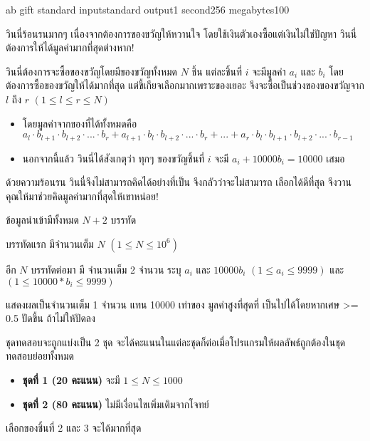 \documentclass[11pt,a4paper]{article}
\begin{document}
\begin{problem}{ab gift }{standard input}{standard output}{1 second}{256 megabytes}{100}

วินนี่ร้อนรนมากๆ เนื่องจากต้องการของขวัญให้หวานใจ โดยใช้เงินตัวเองซื้อแต่เงินไม่ใช่ปัญหา วินนี่ต้องการให้ได้มูลค่ามากที่สุดต่างหาก!

วินนี่ต้องการจะซื้อของขวัญโดยมีของขวัญทั้งหมด $N$ ชิ้น แต่ละชิ้นที่ $i$ จะมีมูลค่า $a_i$ และ $b_i$
โดยต้องการซื้อของขวัญให้ได้มากที่สุด แต่ขี้เกียจเลือกมากเพราะของเยอะ จึงจะซื้อเป็นช่วงของของขวัญจาก $l$ ถึง $r$ $( 1 \leq l \leq r \leq N )$ 
\begin{itemize}

\item โดยมูลค่าจากของที่ได้ทั้งหมดคือ  $a_l \cdot b_{l+1} \cdot b_{l+2} \cdot ... \cdot b_r +
a_{l+1} \cdot b_l \cdot b_{l+2} \cdot ... \cdot b_r +...+ a_r \cdot b_l \cdot b_{l+1} \cdot b_{l+2} \cdot ... \cdot b_{r-1}$ 
\item นอกจากนี้แล้ว วินนี่ได้สังเกตุว่า ทุกๆ ของขวัญชิ้นที่ $i$ จะมี $a_i+10000b_i = 10000$ เสมอ
\end{itemize}

ด้วยความร้อนรน วินนี่จึงไม่สามารถคิดได้อย่างที่เป็น จึงกลัวว่าจะไม่สามารถ เลือกได้ดีที่สุด จึงวานคุณให้มาช่วยคิดมูลค่ามากที่สุดให้เขาหน่อย! 

\InputFile
ข้อมูลนำเข้ามีทั้งหมด $N+2$ บรรทัด

บรรทัดแรก มีจำนวนเต็ม $N$ $( 1 \leq N \leq 10^6 )$ 

อีก $N$ บรรทัดต่อมา มี จำนวนเต็ม 2 จำนวน ระบุ $a_i$ และ $10000b_i$
$( 1 \leq a_i \leq 9999 )$ และ $( 1 \leq 10000 * b_i \leq 9999 ) $

\OutputFile
แสดงผลเป็นจำนวนเต็ม 1 จำนวน แทน 10000 เท่าของ มูลค่าสูงที่สุดที่ เป็นไปได้โดยหากเศษ >= 0.5 ปัดขึ้น ถ้าไม่ให้ปัดลง

\Scoring
ชุดทดสอบจะถูกแบ่งเป็น 2 ชุด จะได้คะแนนในแต่ละชุดก็ต่อเมื่อโปรแกรมให้ผลลัพธ์ถูกต้องในชุดทดสอบย่อยทั้งหมด

\begin{itemize}

\item \textbf{ชุดที่ 1  (20 คะแนน)} จะมี $1 \leq N \leq 1000$

\item \textbf{ชุดที่ 2 (80 คะแนน)} ไม่มีเงื่อนไขเพิ่มเติมจากโจทย์

\end{itemize}

\Example

\begin{example}
%
\end{example}

\Note

เลือกของชิ้นที่ 2 และ 3 จะได้มากที่สุด

\end{problem}
\end{document}
